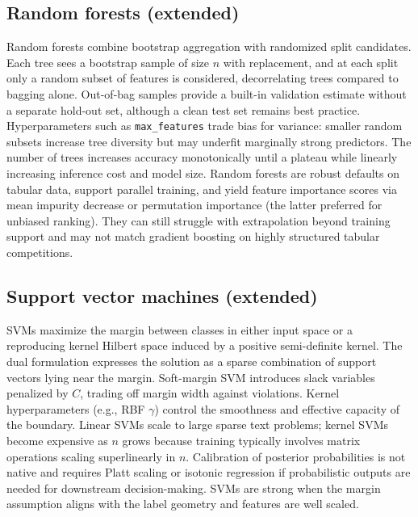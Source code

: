 \documentclass[11pt,a4paper]{article}
\begin{document}
\subsection*{Random forests (extended)}
Random forests combine bootstrap aggregation with randomized split candidates. Each tree sees a bootstrap sample of size $n$ with replacement, and at each split only a random subset of features is considered, decorrelating trees compared to bagging alone. Out-of-bag samples provide a built-in validation estimate without a separate hold-out set, although a clean test set remains best practice. Hyperparameters such as \texttt{max\_features} trade bias for variance: smaller random subsets increase tree diversity but may underfit marginally strong predictors. The number of trees increases accuracy monotonically until a plateau while linearly increasing inference cost and model size. Random forests are robust defaults on tabular data, support parallel training, and yield feature importance scores via mean impurity decrease or permutation importance (the latter preferred for unbiased ranking). They can still struggle with extrapolation beyond training support and may not match gradient boosting on highly structured tabular competitions.

\subsection*{Support vector machines (extended)}
SVMs maximize the margin between classes in either input space or a reproducing kernel Hilbert space induced by a positive semi-definite kernel. The dual formulation expresses the solution as a sparse combination of support vectors lying near the margin. Soft-margin SVM introduces slack variables penalized by $C$, trading off margin width against violations. Kernel hyperparameters (e.g., RBF $\gamma$) control the smoothness and effective capacity of the boundary. Linear SVMs scale to large sparse text problems; kernel SVMs become expensive as $n$ grows because training typically involves matrix operations scaling superlinearly in $n$. Calibration of posterior probabilities is not native and requires Platt scaling or isotonic regression if probabilistic outputs are needed for downstream decision-making. SVMs are strong when the margin assumption aligns with the label geometry and features are well scaled.
\end{document}
